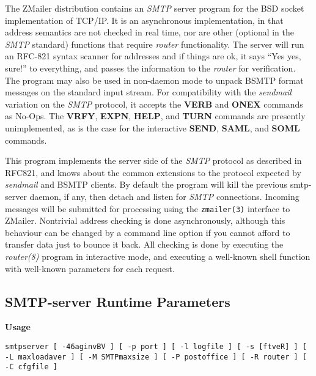 
The ZMailer distribution contains an {\em SMTP\/} server program
for the BSD socket implementation of TCP/IP.
It is an asynchronous implementation, in that address semantics are
not checked in real time, nor are other (optional in the {\em SMTP\/}
standard) functions that require {\em router\/} functionality.
The server will run an RFC-821 syntax scanner for addresses and if
things are ok, it says ``Yes yes, sure!'' to everything, and passes
the information to the {\em router\/} for verification.
The program may also be used in non-daemon mode to unpack BSMTP format
messages on the standard input stream.
For compatibility with the {\em sendmail\/} variation on the {\em SMTP\/}
protocol, it accepts the {\bf VERB} and {\bf ONEX} commands as No-Ops.
The {\bf VRFY}, {\bf EXPN}, {\bf HELP}, and {\bf TURN} commands are
presently unimplemented, as is the case for the interactive {\bf SEND},
{\bf SAML}, and {\bf SOML} commands.

This program implements the server side of the {\em SMTP\/} protocol
as described in RFC821, and knows about the common extensions to
the protocol expected by {\em sendmail\/} and BSMTP clients.
By default the program will kill the previous smtp-server daemon,
if any, then detach and listen for {\em SMTP\/} connections.
Incoming messages will be submitted for processing using the 
{\tt zmailer(3)} interface to ZMailer. Nontrivial address checking is 
done asynchronously, although this behaviour can be changed by a command 
line option if you cannot afford to transfer data just to bounce it back. 
All checking is done by executing the {\em router(8)\/} program in 
interactive mode, and executing a well-known shell function with well-known 
parameters for each request.




\subsection{SMTP-server Runtime Parameters}



{\bf Usage}

{\tt smtpserver [ -46aginvBV ] [ -p port ] [ -l logfile ] [ -s [ftveR] ] [ -L maxloadaver ] [ -M SMTPmaxsize ] [ -P postoffice ] [ -R router ] [ -C cfgfile ]}

